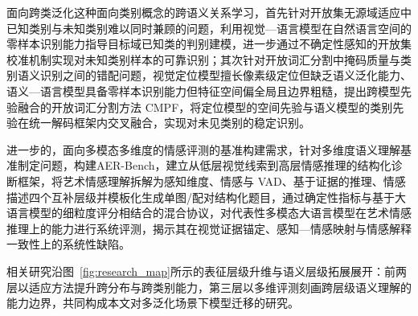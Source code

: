 面向跨类泛化这种面向类别概念的跨语义关系学习，首先针对开放集无源域适应中已知类别与未知类别难以同时兼顾的问题，利用视觉—语言模型在自然语言空间的零样本识别能力指导目标域已知类的判别建模，进一步通过不确定性感知的开放集校准机制实现对未知类别样本的可靠识别；其次针对开放词汇分割中掩码质量与类别语义识别之间的错配问题，视觉定位模型擅长像素级定位但缺乏语义泛化能力、语义—语言模型具备零样本识别能力但特征空间偏全局且边界粗糙，提出跨模型先验融合的开放词汇分割方法 CMPF，将定位模型的空间先验与语义模型的类别先验在统一解码框架内交叉融合，实现对未见类别的稳定识别。

进一步的，面向多模态多维度的情感评测的基准构建需求，针对多维度语义理解基准制定问题，构建AER-Bench，建立从低层视觉线索到高层情感推理的结构化诊断框架，将艺术情感理解拆解为感知维度、情感与 VAD、基于证据的推理、情感描述四个互补层级并模板化生成单图/配对结构化题目，通过确定性指标与基于大语言模型的细粒度评分相结合的混合协议，对代表性多模态大语言模型在艺术情感推理上的能力进行系统评测，揭示其在视觉证据锚定、感知—情感映射与情感解释一致性上的系统性缺陷。

相关研究沿图~\ref{fig:research_map}所示的表征层级升维与语义层级拓展展开：前两层以适应方法提升跨分布与跨类别能力，第三层以多维评测刻画跨层级语义理解的能力边界，共同构成本文对多泛化场景下模型迁移的研究。
